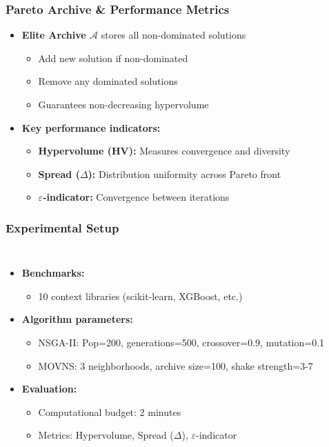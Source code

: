 \documentclass{beamer}
\begin{document}
\begin{frame}
\begin{columns}[T]
\begin{center}
\end{center}
\end{columns}
\end{frame}

\begin{frame}
\frametitle{Pareto Archive \& Performance Metrics}

\begin{itemize}
\item \textbf{Elite Archive $\mathcal{A}$} stores all non-dominated solutions
\vspace{0.2cm}
  \begin{itemize}
  \item Add new solution if non-dominated
  \item Remove any dominated solutions
  \item Guarantees non-decreasing hypervolume
  \end{itemize}
  \vspace{0.2cm}
\item \textbf{Key performance indicators:}
\vspace{0.2cm}
\begin{itemize}
  \item \textbf{Hypervolume (HV):} Measures convergence and diversity
  \item \textbf{Spread ($\Delta$):} Distribution uniformity across Pareto front
  \item \textbf{$\varepsilon$-indicator:} Convergence between iterations
\end{itemize}
\end{itemize}

\end{frame}

\begin{frame}
\frametitle{Experimental Setup}
\begin{columns}[T]
\begin{itemize}
\item \textbf{Benchmarks:}
  \begin{itemize}
  \item 10 context libraries (scikit-learn, XGBoost, etc.)
  \end{itemize}
\item \textbf{Algorithm parameters:}
  \begin{itemize}
  \item NSGA-II: Pop=200, generations=500, crossover=0.9, mutation=0.1
  \item MOVNS: 3 neighborhoods, archive size=100, shake strength=3-7
  \end{itemize}
\item \textbf{Evaluation:}
  \begin{itemize}
  \item Computational budget: 2 minutes
  \item Metrics: Hypervolume, Spread ($\Delta$), $\varepsilon$-indicator
  \end{itemize}
\end{itemize}
\end{columns}
\end{frame}
\end{document}
